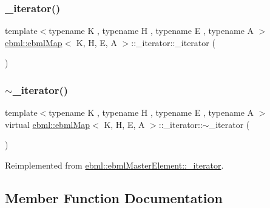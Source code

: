\mbox{\label{classebml_1_1ebmlMap_1_1__iterator_a4cbcb4c34c842171b9b628c681c4e77a}} 
\subsubsection{\texorpdfstring{\+\_\+iterator()}{\_iterator()}\hspace{0.1cm}{\footnotesize\ttfamily [3/3]}}
{\footnotesize\ttfamily template$<$typename K , typename H , typename E , typename A $>$ \\
\mbox{\hyperlink{classebml_1_1ebmlMap}{ebml\+::ebml\+Map}}$<$ K, H, E, A $>$\+::\+\_\+iterator\+::\+\_\+iterator (\begin{DoxyParamCaption}{ }\end{DoxyParamCaption})}

\mbox{\label{classebml_1_1ebmlMap_1_1__iterator_a276c17f3a552f25f09735ffb6679fabd}} 
\subsubsection{\texorpdfstring{$\sim$\+\_\+iterator()}{~\_iterator()}}
{\footnotesize\ttfamily template$<$typename K , typename H , typename E , typename A $>$ \\
virtual \mbox{\hyperlink{classebml_1_1ebmlMap}{ebml\+::ebml\+Map}}$<$ K, H, E, A $>$\+::\+\_\+iterator\+::$\sim$\+\_\+iterator (\begin{DoxyParamCaption}{ }\end{DoxyParamCaption})\hspace{0.3cm}{\ttfamily [virtual]}}



Reimplemented from \mbox{\hyperlink{classebml_1_1ebmlMasterElement_1_1__iterator_a499f5fe9a5dddf51dd0ca181fc98f561}{ebml\+::ebml\+Master\+Element\+::\+\_\+iterator}}.



\subsection{Member Function Documentation}
\mbox{\label{classebml_1_1ebmlMap_1_1__iterator_a4ae1670445455ff5b27e5b3e2bc93142}} 
